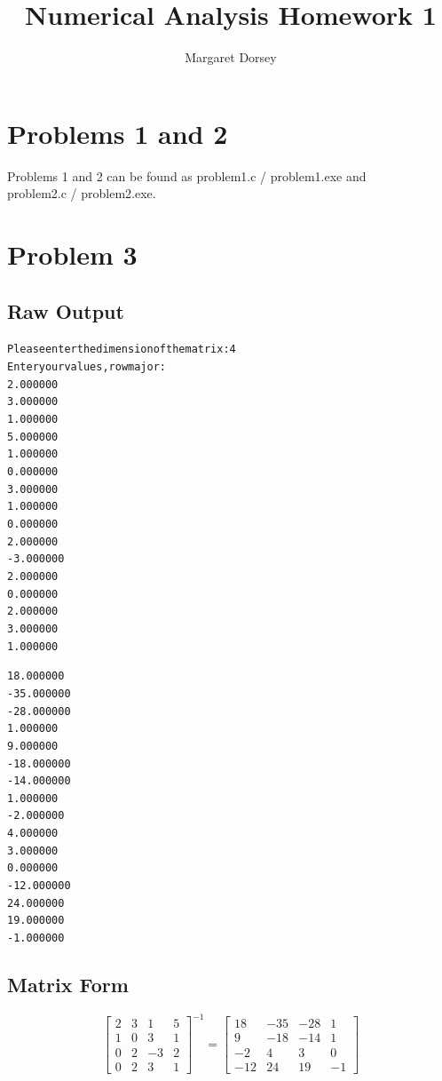 \documentclass[11pt]{article} %
\title{Numerical Analysis Homework 1}
\author{Margaret Dorsey}
\begin{document}
\maketitle

\section*{Problems 1 and 2}
\par Problems 1 and 2 can be found as problem1.c / problem1.exe and \\ problem2.c / problem2.exe.

\section*{Problem 3}
\subsection*{Raw Output}
\begin{alltt}
Please enter the dimension of the matrix: 4
Enter your values, row major: 
2.000000
3.000000
1.000000
5.000000
1.000000
0.000000
3.000000
1.000000
0.000000
2.000000
-3.000000
2.000000
0.000000
2.000000
3.000000
1.000000

18.000000
-35.000000
-28.000000
1.000000
9.000000
-18.000000
-14.000000
1.000000
-2.000000
4.000000
3.000000
0.000000
-12.000000
24.000000
19.000000
-1.000000
\end{alltt}
\subsection*{Matrix Form}
\[
\begin{bmatrix}
2&3&1&5\\
1&0&3&1\\
0&2&-3&2 \\
0&2&3&1
\end{bmatrix}
^{-1}
=
\begin{bmatrix}
18&-35&-28&1\\
9&-18&-14&1\\
-2&4&3&0 \\
-12&24&19&-1
\end{bmatrix}
\]
\end{document}
